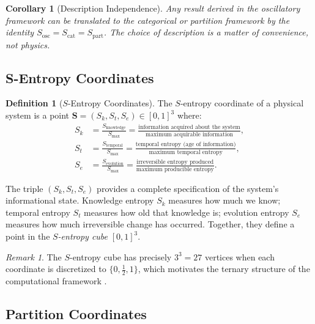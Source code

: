 \documentclass[12pt]{article}
\newtheorem{corollary}[theorem]{Corollary}
\theoremstyle{definition}
\newtheorem{definition}[theorem]{Definition}
\theoremstyle{remark}
\newtheorem{remark}[theorem]{Remark}
\newcommand{\Sk}{S_k}
\newcommand{\St}{S_t}
\newcommand{\Se}{S_e}
\newcommand{\Sosc}{S_{\mathrm{osc}}}
\newcommand{\Scat}{S_{\mathrm{cat}}}
\newcommand{\Spart}{S_{\mathrm{part}}}
\begin{document}
\begin{corollary}[Description Independence]
\label{cor:description_independence}
Any result derived in the oscillatory framework can be translated to the categorical or partition framework by the identity $\Sosc = \Scat = \Spart$. The choice of description is a matter of convenience, not physics.
\end{corollary}

\subsection{S-Entropy Coordinates}

\begin{definition}[$S$-Entropy Coordinates]
\label{def:sentropy}
The $S$-entropy coordinate of a physical system is a point $\mathbf{S} = (\Sk, \St, \Se) \in [0,1]^3$ where:
\begin{align}
  \Sk &= \frac{S_{\mathrm{knowledge}}}{S_{\max}} = \frac{\text{information acquired about the system}}{\text{maximum acquirable information}}, \label{eq:sk} \\
  \St &= \frac{S_{\mathrm{temporal}}}{S_{\max}} = \frac{\text{temporal entropy (age of information)}}{\text{maximum temporal entropy}}, \label{eq:st} \\
  \Se &= \frac{S_{\mathrm{evolution}}}{S_{\max}} = \frac{\text{irreversible entropy produced}}{\text{maximum producible entropy}}. \label{eq:se}
\end{align}
\end{definition}

The triple $(\Sk, \St, \Se)$ provides a complete specification of the system's informational state. Knowledge entropy $\Sk$ measures how much we know; temporal entropy $\St$ measures how old that knowledge is; evolution entropy $\Se$ measures how much irreversible change has occurred. Together, they define a point in the \emph{$S$-entropy cube} $[0,1]^3$.

\begin{remark}
The $S$-entropy cube has precisely $3^3 = 27$ vertices when each coordinate is discretized to $\{0, \tfrac{1}{2}, 1\}$, which motivates the ternary structure of the computational framework \cite{sachikonye2026converter}.
\end{remark}

\subsection{Partition Coordinates}
\end{document}
